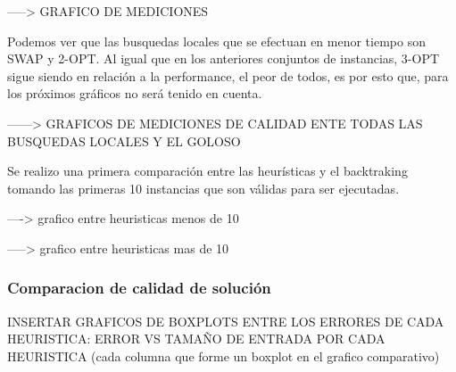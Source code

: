 -----> GRAFICO DE MEDICIONES 

Podemos ver que las busquedas locales que se efectuan en menor tiempo son SWAP y 2-OPT. 
Al igual que en los anteriores conjuntos de instancias, 3-OPT sigue siendo en relaci\'on a la  performance, el peor de todos, es por esto que, para los pr\'oximos gr\'aficos no ser\'a tenido en cuenta.

------> GRAFICOS DE MEDICIONES DE CALIDAD ENTE TODAS LAS BUSQUEDAS LOCALES Y EL GOLOSO


Se realizo una primera comparaci\'on entre las heur\'isticas y el backtraking tomando las primeras 10 instancias que son v\'alidas para ser ejecutadas.

----> grafico entre heuristicas menos de 10

-----> grafico entre heuristicas mas de 10

\subsubsection{Comparacion de calidad de solución}
INSERTAR GRAFICOS DE BOXPLOTS ENTRE LOS ERRORES DE CADA HEURISTICA:
	ERROR VS TAMAÑO DE ENTRADA POR CADA HEURISTICA (cada columna que forme un boxplot en el grafico comparativo)
	